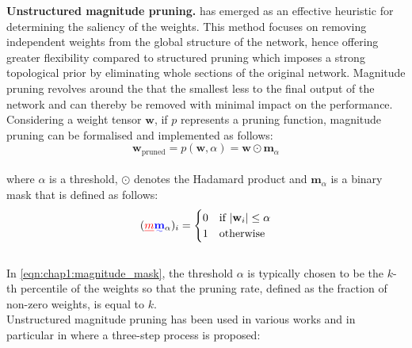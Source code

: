 \noindent\textbf{Unstructured magnitude pruning.} \DIFdelbegin {}\DIFdelend \DIFaddbegin {}\DIFaddend has emerged as an effective
heuristic for determining the saliency of the weights. This method focuses on
removing independent weights from the global structure of the network, hence
offering greater flexibility compared to structured pruning which imposes a
strong topological prior by eliminating whole sections of the original network.
Magnitude pruning revolves around the \DIFdelbegin {}\DIFdelend \DIFaddbegin {}\DIFaddend that the smallest \DIFdelbegin {}\DIFdelend \DIFaddbegin {}\DIFaddend less to the final output of the network and can thereby be removed
with minimal impact on the performance. Considering a weight tensor
$\mathbf{w}$, if $p$ represents a pruning function, magnitude pruning can be
formalised and implemented as follows:\\

\begin{equation}
  \label{eqn:chap1:magnitude_pruning}
  \mathbf{w}_{\text{pruned}} = p(\mathbf{w}, \alpha) = \mathbf{w} \odot \mathbf{m}_\alpha
\end{equation}\\

\noindent where $\alpha$ is a threshold, $\odot$ denotes the Hadamard product and
$\mathbf{m}_\alpha$ is a binary mask that is defined as follows:\\

\begin{equation}
  \label{eqn:chap1:magnitude_mask}
  (\DIFdelbegin \DIFdel{m}\DIFdelend \DIFaddbegin \DIFadd{\mathbf{m}}\DIFaddend _\alpha)_i = \begin{cases}
  0 & \text{if } |\mathbf{w}_i| \leq \alpha \\
    1 & \text{otherwise}
  \end{cases}
\end{equation}\\

\noindent In \cref{eqn:chap1:magnitude_mask}, the threshold $\alpha$ is
typically chosen to be the $k$-th percentile of the weights so that the pruning
rate, defined as the fraction of non-zero weights, is equal to $k$.\\

Unstructured magnitude pruning has been used in various works and in particular
in \cite{DBLP:conf/nips/HanPTD15} where a three-step process is proposed:\\

